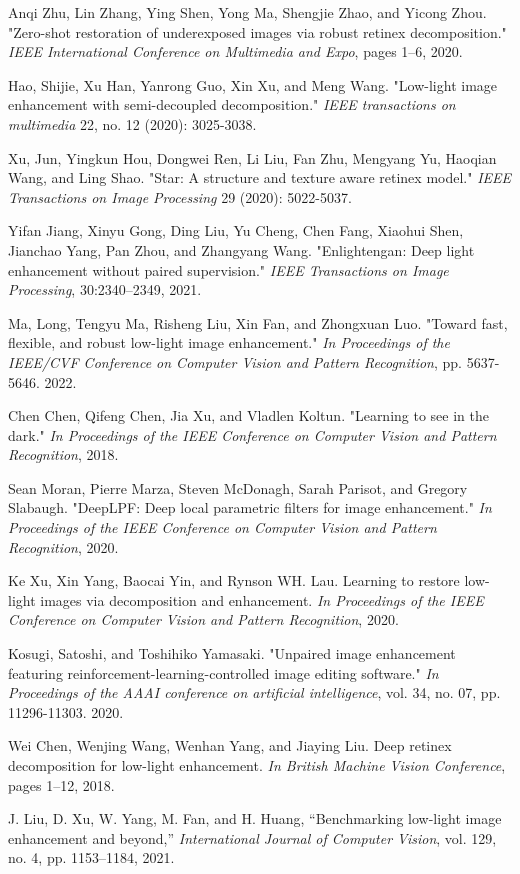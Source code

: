 Anqi Zhu, Lin Zhang, Ying Shen, Yong Ma, Shengjie Zhao, and Yicong Zhou. "Zero-shot restoration of underexposed images via robust retinex decomposition." \textit{IEEE International Conference on Multimedia and Expo}, pages 1–6, 2020. %

Hao, Shijie, Xu Han, Yanrong Guo, Xin Xu, and Meng Wang. "Low-light image enhancement with semi-decoupled decomposition." \textit{IEEE transactions on multimedia} 22, no. 12 (2020): 3025-3038. %

Xu, Jun, Yingkun Hou, Dongwei Ren, Li Liu, Fan Zhu, Mengyang Yu, Haoqian Wang, and Ling Shao. "Star: A structure and texture aware retinex model." \textit{IEEE Transactions on Image Processing} 29 (2020): 5022-5037. %

Yifan Jiang, Xinyu Gong, Ding Liu, Yu Cheng, Chen Fang, Xiaohui Shen, Jianchao Yang, Pan Zhou, and Zhangyang Wang. "Enlightengan: Deep light enhancement without paired supervision." \textit{IEEE Transactions on Image Processing}, 30:2340–2349, 2021. %

Ma, Long, Tengyu Ma, Risheng Liu, Xin Fan, and Zhongxuan Luo. "Toward fast, flexible, and robust low-light image enhancement." \textit{In Proceedings of the IEEE/CVF Conference on Computer Vision and Pattern Recognition}, pp. 5637-5646. 2022. %

Chen Chen, Qifeng Chen, Jia Xu, and Vladlen Koltun. "Learning to see in the dark." \textit{In Proceedings of the IEEE Conference on Computer Vision and Pattern Recognition}, 2018. %

Sean Moran, Pierre Marza, Steven McDonagh, Sarah Parisot, and Gregory Slabaugh. "DeepLPF: Deep local parametric filters for image enhancement." \textit{In Proceedings of the IEEE Conference on Computer Vision and Pattern Recognition}, 2020. %

Ke Xu, Xin Yang, Baocai Yin, and Rynson WH. Lau. Learning to restore low-light images via decomposition and enhancement. \textit{In Proceedings of the IEEE Conference on Computer Vision and Pattern Recognition}, 2020. %

Kosugi, Satoshi, and Toshihiko Yamasaki. "Unpaired image enhancement featuring reinforcement-learning-controlled image editing software." \textit{In Proceedings of the AAAI conference on artificial intelligence}, vol. 34, no. 07, pp. 11296-11303. 2020. %

Wei Chen, Wenjing Wang, Wenhan Yang, and Jiaying Liu. Deep retinex decomposition for low-light enhancement. \textit{In British Machine Vision Conference}, pages 1–12, 2018. %

J. Liu, D. Xu, W. Yang, M. Fan, and H. Huang, “Benchmarking low-light image enhancement and beyond,” \textit{International Journal of Computer Vision}, vol. 129, no. 4, pp. 1153–1184, 2021. %